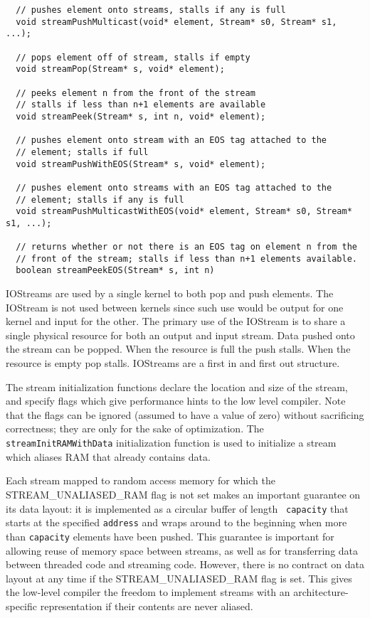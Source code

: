 {\begin{verbatim}
  // pushes element onto streams, stalls if any is full
  void streamPushMulticast(void* element, Stream* s0, Stream* s1, ...);
  
  // pops element off of stream, stalls if empty
  void streamPop(Stream* s, void* element);
  
  // peeks element n from the front of the stream
  // stalls if less than n+1 elements are available
  void streamPeek(Stream* s, int n, void* element);

  // pushes element onto stream with an EOS tag attached to the
  // element; stalls if full
  void streamPushWithEOS(Stream* s, void* element);

  // pushes element onto streams with an EOS tag attached to the
  // element; stalls if any is full
  void streamPushMulticastWithEOS(void* element, Stream* s0, Stream* s1, ...);

  // returns whether or not there is an EOS tag on element n from the
  // front of the stream; stalls if less than n+1 elements available.
  boolean streamPeekEOS(Stream* s, int n)

\end{verbatim}}

IOStreams are used by a single kernel to both pop and push elements.
The IOStream is not used between kernels since such use would be
output for one kernel and input for the other. The primary use of the
IOStream is to share a single physical resource for both an output and
input stream.  Data pushed onto the stream can be popped.  When the
resource is full the push stalls.  When the resource is empty pop
stalls.  IOStreams are a first in and first out structure.

 The stream initialization functions
declare the location and size of the stream, and specify flags which
give performance hints to the low level compiler.  Note that the flags
can be ignored (assumed to have a value of zero) without sacrificing
correctness; they are only for the sake of optimization.  The {\tt
streamInitRAMWithData} initialization function is used to initialize a
stream which aliases RAM that already contains data.

Each stream mapped to random access memory for which the
STREAM\_UNALIASED\_RAM flag is not set makes an important guarantee on
its data layout: it is implemented as a circular buffer of length {\tt
capacity} that starts at the specified {\tt address} and wraps around
to the beginning when more than {\tt capacity} elements have been
pushed.  This guarantee is important for allowing reuse of memory
space between streams, as well as for transferring data between
threaded code and streaming code.  However, there is no contract on
data layout at any time if the STREAM\_UNALIASED\_RAM flag is
set. This gives the low-level compiler the freedom to implement
streams with an architecture-specific representation if their contents
are never aliased.

